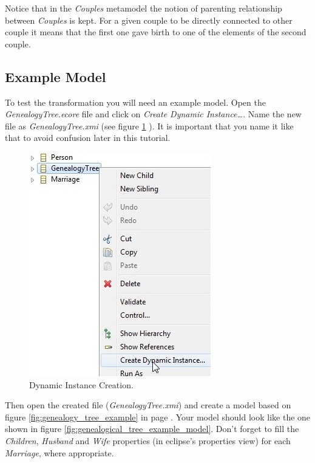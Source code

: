 Notice that in the \emph{Couples} metamodel the notion of parenting
relationship between \emph{Couples} is kept. For a given couple to be
directly connected to other couple it means that the first one gave birth to one
of the elements of the second couple.

\clearpage

\subsection{Example Model}
\label{subsec:creating_example_model}

To test the transformation you will need an example model. Open the
\emph{GenealogyTree.ecore} file and click on \emph{Create Dynamic
Instance\ldots}. Name the new file as \emph{GenealogyTree.xmi} (see figure
\ref{fig:create_dinamic_instance} ). It is important that you name it like that
to avoid confusion later in this tutorial.


\begin{figure}[h]
\begin{center}
  \includegraphics[scale=0.7]{imgs/create_dinamic_instance.jpg}
  \caption{Dynamic Instance Creation.}
  \label{fig:create_dinamic_instance}
\end{center}
\end{figure}

Then open the created file (\emph{GenealogyTree.xmi}) and create a model based
on figure \ref{fig:genealogy_tree_example} in page
\pageref{fig:genealogy_tree_example}. Your model should look like the one shown
in figure \ref{fig:genealogical_tree_example_model}. Don't forget to fill the
\emph{Children}, \emph{Husband} and \emph{Wife} properties (in eclipse's
properties view) for each \emph{Marriage}, where appropriate.

